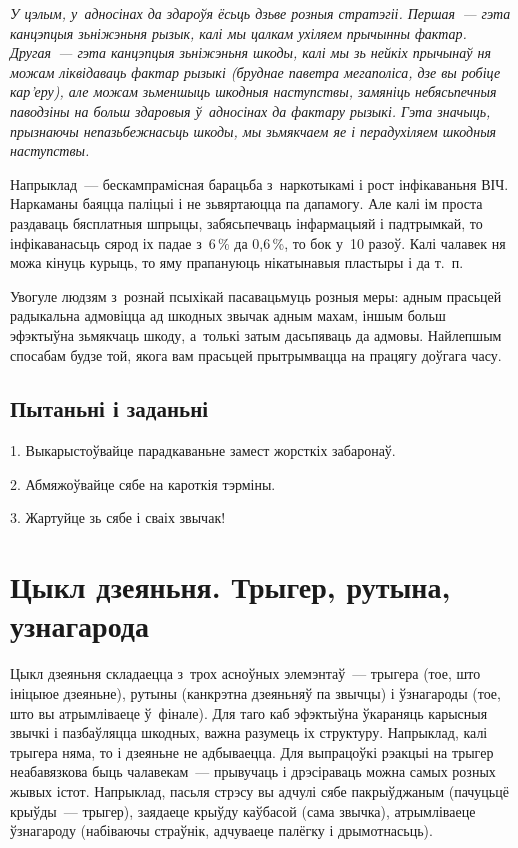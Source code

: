 \emph{У цэлым, у~адносінах да здароўя ёсьць дзьве розныя стратэгіі. Першая~--- гэта канцэпцыя зьніжэньня рызык, калі мы цалкам ухіляем прычынны фактар. Другая~--- гэта канцэпцыя зьніжэньня шкоды, калі мы зь нейкіх прычынаў ня можам ліквідаваць фактар рызыкі (бруднае паветра мегаполіса, дзе вы робіце кар'еру), але можам зьменшыць шкодныя наступствы, замяніць небясьпечныя паводзіны на больш здаровыя ў~адносінах да фактару рызыкі. Гэта значыць, прызнаючы непазьбежнасьць шкоды, мы зьмякчаем яе і перадухіляем шкодныя наступствы.}

Напрыклад~--- бескампрамісная барацьба з~наркотыкамі і рост інфікаваньня ВІЧ. Наркаманы баяцца паліцыі і не зьвяртаюцца па дапамогу. Але калі ім проста раздаваць бясплатныя шпрыцы, забясьпечваць інфармацыяй і падтрымкай, то інфікаванасьць сярод іх падае з~6\,\% да 0,6\,\%, то бок у~10 разоў. Калі чалавек ня можа кінуць курыць, то яму прапануюць нікатынавыя пластыры і да т.~п.

Увогуле людзям з~рознай псыхікай пасавацьмуць розныя меры: адным прасьцей радыкальна адмовіцца ад шкодных звычак адным махам, іншым больш эфэктыўна зьмякчаць шкоду, а~толькі затым дасьпяваць да адмовы. Найлепшым спосабам будзе той, якога вам прасьцей прытрымвацца на працягу доўгага часу.

\subsection*{Пытаньні і заданьні}

1. Выкарыстоўвайце парадкаваньне замест жорсткіх забаронаў.

2. Абмяжоўвайце сябе на кароткія тэрміны.

3. Жартуйце зь сябе і сваіх звычак!


\section{Цыкл дзеяньня. Трыгер, рутына, узнагарода}

Цыкл дзеяньня складаецца з~трох асноўных элемэнтаў~--- трыгера (тое, што ініцыюе дзеяньне), рутыны (канкрэтна дзеяньняў па звычцы) і ўзнагароды (тое, што вы атрымліваеце ў~фінале). Для таго каб эфэктыўна ўкараняць карысныя звычкі і пазбаўляцца шкодных, важна разумець іх структуру. Напрыклад, калі трыгера няма, то і дзеяньне не адбываецца. Для выпрацоўкі рэакцыі на трыгер неабавязкова быць чалавекам~--- прывучаць і дрэсіраваць можна самых розных жывых істот. Напрыклад, пасьля стрэсу вы адчулі сябе пакрыўджаным (пачуцьцё крыўды~--- трыгер), заядаеце крыўду каўбасой (сама звычка), атрымліваеце ўзнагароду (набіваючы страўнік, адчуваеце палёгку і дрымотнасьць).


